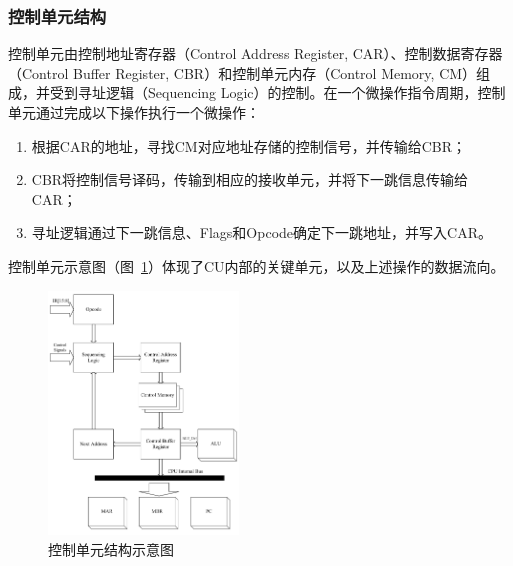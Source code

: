 \documentclass[lang=cn,a4paper,newtx]{elegantpaper}
\begin{document}
\subsubsection{控制单元结构}\label{sec:cu:structure}
控制单元由控制地址寄存器（Control Address Register, CAR）、控制数据寄存器（Control Buffer Register, CBR）和控制单元内存（Control Memory, CM）组成，并受到寻址逻辑（Sequencing Logic）的控制。在一个微操作指令周期，控制单元通过完成以下操作执行一个微操作：
\begin{enumerate}
  \item 根据CAR的地址，寻找CM对应地址存储的控制信号，并传输给CBR；
  \item CBR将控制信号译码，传输到相应的接收单元，并将下一跳信息传输给CAR；
  \item 寻址逻辑通过下一跳信息、Flags和Opcode确定下一跳地址，并写入CAR。
\end{enumerate}
控制单元示意图（图~\ref{fig:controlunit}）体现了CU内部的关键单元，以及上述操作的数据流向。

\begin{figure}[htbp]
  \centering
  \includegraphics[width = 0.45\textwidth]{figure/CU.pdf}
  \caption{控制单元结构示意图}
  \label{fig:controlunit}
\end{figure}
\end{document}
